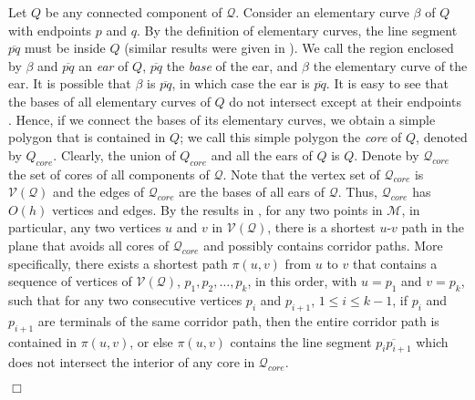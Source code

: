\documentclass[english,runningheads,11pt]{llncs}
\def\calM{\mathcal{M}}
\def\calQ{\mathcal{Q}}
\def\calV{\mathcal{V}}
\newenvironment{proof}{\noindent {\textbf{Proof:}}\rm}{\hfill $\Box$\rm}
\begin{document}
\begin{proof}
Let $Q$ be any connected component of $\calQ$. Consider an elementary curve $\beta$ of
$Q$ with endpoints $p$ and $q$. By
the definition of elementary curves, the line segment $\overline{pq}$
must be inside $Q$ (similar results were given in
\cite{ref:ChenA11ESA,ref:ChenCo12arXiv,ref:ChenL113STACS}). We call
the region enclosed by $\beta$ and $\overline{pq}$ an {\em ear} of $Q$,
$\overline{pq}$ the {\em base} of the ear, and $\beta$ the elementary curve of the ear.
It is possible that $\beta$ is $\overline{pq}$, in which case
the ear is $\overline{pq}$. It is easy to see that the bases of all
elementary curves of $Q$ do not intersect except at their endpoints
\cite{ref:ChenA11ESA,ref:ChenCo12arXiv,ref:ChenL113STACS}. Hence, if
we connect the bases of its elementary curves, we obtain a simple
polygon that is contained in $Q$; we call this simple polygon the
{\em core} of $Q$, denoted by $Q_{core}$. Clearly, the union of
$Q_{core}$ and all the ears of $Q$ is $Q$. Denote by $\calQ_{core}$ the set of
cores of all components of $\calQ$. Note
that the vertex set of $\calQ_{core}$ is $\calV(\calQ)$ and the edges of
$\calQ_{core}$ are the bases of all ears of $\calQ$.
Thus, $\calQ_{core}$ has $O(h)$ vertices and edges.
By the results in
\cite{ref:ChenA11ESA,ref:ChenCo12arXiv,ref:ChenL113STACS}, for any
two points in $\calM$, in particular, any two vertices $u$ and $v$ in $\calV(\calQ)$,
there is a shortest $u$-$v$ path in the plane that avoids all
cores of $\calQ_{core}$ and possibly contains corridor paths. More
specifically, there exists a shortest path $\pi(u,v)$ from $u$ to $v$
that contains a sequence of vertices of $\calV(\calQ)$,
$p_1,p_2,\ldots,p_k$, in this order, with $u=p_1$ and $v=p_k$, such that for
any two consecutive vertices $p_i$ and $p_{i+1}$, $1\leq i\leq k-1$, if
$p_i$ and $p_{i+1}$ are terminals of the same corridor path, then the
entire corridor path is contained in $\pi(u,v)$, or else $\pi(u,v)$
contains the line segment $\overline{p_ip_{i+1}}$ which does not
intersect the interior of any core in $\calQ_{core}$.





\end{proof}
\end{document}
